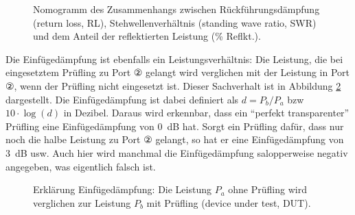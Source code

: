\documentclass[twoside,a4paper,11pt,halfparskip,DIV=11,notitlepage]{scrartcl}
\begin{document}
\begin{figure}[t]
\begin{center}
\end{center}
    \caption{Nomogramm des Zusammenhangs zwischen Rückführungsdämpfung (return loss, RL),
    Stehwellenverhältnis (standing wave ratio, SWR) und dem Anteil der reflektierten Leistung (\% Reflkt.).}
    \label{fig:rlnomogramm}
\end{figure}


Die Einfügedämpfung ist ebenfalls ein Leistungsverhältnis: Die Leistung, die
bei eingesetztem Prüfling zu Port ② gelangt wird verglichen mit der Leistung
in Port ②, wenn der Prüfling nicht eingesetzt ist. Dieser Sachverhalt ist in
Abbildung \ref{fig:insertionloss} dargestellt. Die Einfügedämpfung ist dabei
definiert als $d=P_b/P_a$ bzw $10\cdot\log{(d)}$ in Dezibel. Daraus wird erkennbar,
dass ein ``perfekt transparenter'' Prüfling eine Einfügedämpfung von 0~dB
hat. Sorgt ein Prüfling dafür, dass nur noch die halbe Leistung zu Port ②
gelangt, so hat er eine Einfügedämpfung von 3~dB usw. Auch hier wird manchmal
die Einfügedämpfung salopperweise negativ angegeben, was eigentlich falsch ist.

\begin{figure}[H]
    \begin{center}

        \vspace{5mm}

    \end{center}
    \caption{Erklärung Einfügedämpfung: Die Leistung $P_a$ ohne Prüfling wird
    verglichen zur Leistung $P_b$ mit Prüfling (device under test, DUT).}
    \label{fig:insertionloss}
\end{figure}
\end{document}
